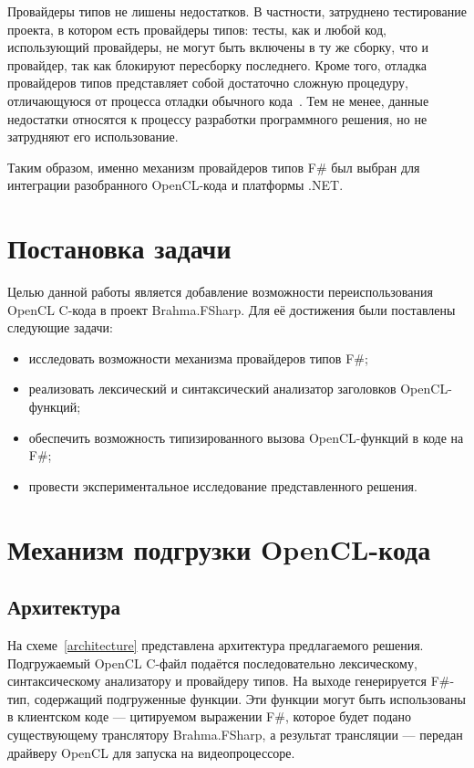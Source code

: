 Провайдеры типов не лишены недостатков. В частности, затруднено тестирование проекта, в котором есть провайдеры типов: тесты, как и любой код, использующий провайдеры, не могут быть включены в ту же сборку, что и провайдер, так как блокируют пересборку последнего. Кроме того, отладка провайдеров типов представляет собой достаточно сложную процедуру, отличающуюся от процесса отладки обычного кода~\cite{TypeProvidersTips}. Тем не менее, данные недостатки относятся к процессу разработки программного решения, но не затрудняют его использование.

Таким образом, именно механизм провайдеров типов F\# был выбран для интеграции разобранного OpenCL-кода и платформы .NET.

\section{Постановка задачи}

Целью данной работы является добавление возможности переиспользования OpenCL C-кода в проект Brahma.FSharp. Для её достижения были поставлены следующие задачи:

\begin{itemize}
    \item исследовать возможности механизма провайдеров типов F\#;
    \item реализовать лексический и синтаксический анализатор заголовков OpenCL-функций;
    \item обеспечить возможность типизированного вызова OpenCL-функций в коде на F\#;
    \item провести экспериментальное исследование представленного решения.
\end{itemize}


\section{Механизм подгрузки OpenCL-кода}

\subsection{Архитектура}
На схеме~\ref{architecture} представлена архитектура предлагаемого решения. Подгружаемый OpenCL C-файл подаётся последовательно лексическому, синтаксическому анализатору и провайдеру типов. На выходе генерируется F\#-тип, содержащий подгруженные функции. Эти функции могут быть использованы в клиентском коде --- цитируемом выражении F\#, которое будет подано существующему транслятору Brahma.FSharp, а результат трансляции --- передан драйверу OpenCL для запуска на видеопроцессоре.


